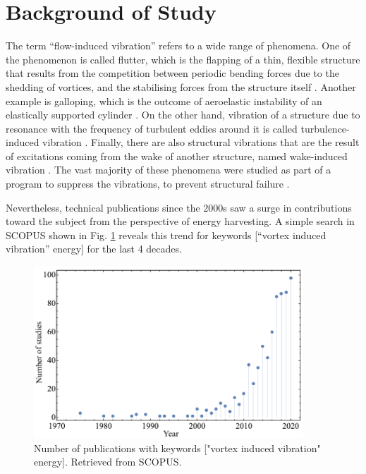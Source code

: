 \documentclass[oneside]{utmthesis}
\begin{document}
\section{Background of Study}
The term “flow-induced vibration” refers to a wide range of phenomena. One of the phenomenon is called flutter, which is the flapping of a thin, flexible structure that results from the competition between periodic bending forces due to the shedding of vortices, and the stabilising forces from the structure itself \citep{Xia2015a}. Another example is galloping, which is the outcome of aeroelastic instability of an elastically supported cylinder \citep{Kluger2013}. On the other hand, vibration of a structure due to resonance with the frequency of turbulent eddies around it is called turbulence-induced vibration \citep{Nakamura2013}. Finally, there are also structural vibrations that are the result of excitations coming from the wake of another structure, named wake-induced vibration \citep{Derakhshandeh2014}. The vast majority of these phenomena were studied as part of a program to suppress the vibrations, to prevent structural failure \citep{Khalak1999}.

Nevertheless, technical publications since the 2000s saw a surge in contributions toward the subject from the perspective of energy harvesting. A simple search in SCOPUS shown in Fig. \ref{fig:scopusTrend} reveals this trend for keywords [“vortex induced vibration” energy] for the last 4 decades.

\begin{figure}[!h]
  \centering
  \includegraphics[width=0.9\textwidth]{figs/scopusTrend}
  \caption{Number of publications with keywords ["vortex induced vibration" energy]. Retrieved from SCOPUS.}
  \label{fig:scopusTrend}
\end{figure}
\end{document}
